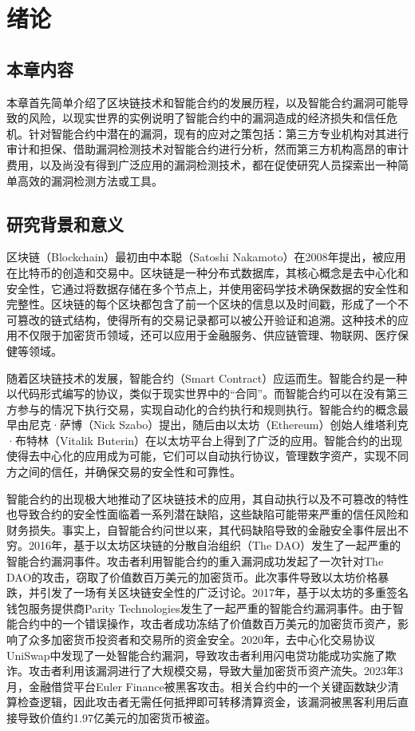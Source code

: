 \chapter{绪论}
\section{本章内容}
本章首先简单介绍了区块链技术和智能合约的发展历程，以及智能合约漏洞可能导致的风险，以现实世界的实例说明了智能合约中的漏洞造成的经济损失和信任危机。针对智能合约中潜在的漏洞，现有的应对之策包括：第三方专业机构对其进行审计和担保、借助漏洞检测技术对智能合约进行分析，然而第三方机构高昂的审计费用，以及尚没有得到广泛应用的漏洞检测技术，都在促使研究人员探索出一种简单高效的漏洞检测方法或工具。


\section{研究背景和意义}

区块链（Blockchain）最初由中本聪（Satoshi Nakamoto）在2008年提出，被应用在比特币的创造和交易中。区块链是一种分布式数据库，其核心概念是去中心化和安全性，它通过将数据存储在多个节点上，并使用密码学技术确保数据的安全性和完整性。区块链的每个区块都包含了前一个区块的信息以及时间戳，形成了一个不可篡改的链式结构，使得所有的交易记录都可以被公开验证和追溯。这种技术的应用不仅限于加密货币领域，还可以应用于金融服务、供应链管理、物联网、医疗保健等领域。

随着区块链技术的发展，智能合约（Smart Contract）应运而生。智能合约是一种以代码形式编写的协议，类似于现实世界中的“合同”。而智能合约可以在没有第三方参与的情况下执行交易，实现自动化的合约执行和规则执行。智能合约的概念最早由尼克·萨博（Nick Szabo）提出，随后由以太坊（Ethereum）创始人维塔利克·布特林（Vitalik Buterin）在以太坊平台上得到了广泛的应用。智能合约的出现使得去中心化的应用成为可能，它们可以自动执行协议，管理数字资产，实现不同方之间的信任，并确保交易的安全性和可靠性。

智能合约的出现极大地推动了区块链技术的应用，其自动执行以及不可篡改的特性也导致合约的安全性面临着一系列潜在缺陷，这些缺陷可能带来严重的信任风险和财务损失。事实上，自智能合约问世以来，其代码缺陷导致的金融安全事件层出不穷。2016年，基于以太坊区块链的分散自治组织（The DAO）发生了一起严重的智能合约漏洞事件。攻击者利用智能合约的重入漏洞成功发起了一次针对The DAO的攻击，窃取了价值数百万美元的加密货币。此次事件导致以太坊价格暴跌，并引发了一场有关区块链安全性的广泛讨论。2017年，基于以太坊的多重签名钱包服务提供商Parity Technologies发生了一起严重的智能合约漏洞事件。由于智能合约中的一个错误操作，攻击者成功冻结了价值数百万美元的加密货币资产，影响了众多加密货币投资者和交易所的资金安全。2020年，去中心化交易协议UniSwap中发现了一处智能合约漏洞，导致攻击者利用闪电贷功能成功实施了欺诈。攻击者利用该漏洞进行了大规模交易，导致大量加密货币资产流失。2023年3月，金融借贷平台Euler Finance被黑客攻击。相关合约中的一个关键函数缺少清算检查逻辑，因此攻击者无需任何抵押即可转移清算资金，该漏洞被黑客利用后直接导致价值约1.97亿美元的加密货币被盗。

